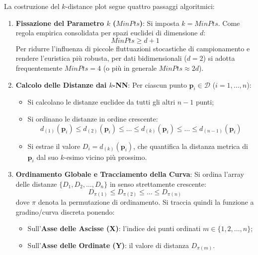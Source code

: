 La costruzione del $k$-distance plot segue quattro passaggi algoritmici:

\begin{enumerate}
    \item \textbf{Fissazione del Parametro $k$ ($MinPts$)}:
    Si imposta $k = MinPts$. Come regola empirica consolidata per spazi euclidei di dimensione $d$:
    \begin{equation}
        MinPts \ge d + 1
    \end{equation}
    Per ridurre l'influenza di piccole fluttuazioni stocastiche di campionamento e rendere l'euristica più robusta, per dati bidimensionali ($d = 2$) si adotta frequentemente $MinPts = 4$ (o più in generale $MinPts \approx 2d$).

    \item \textbf{Calcolo delle Distanze dai $k$-NN}:
    Per ciascun punto $\mathbf{p}_i \in \mathcal{D}$ ($i = 1, \dots, n$):
    \begin{itemize}[noitemsep]
        \item Si calcolano le distanze euclidee da tutti gli altri $n-1$ punti;
        \item Si ordinano le distanze in ordine crescente:
        \begin{equation}
            d_{(1)}(\mathbf{p}_i) \le d_{(2)}(\mathbf{p}_i) \le \dots \le d_{(k)}(\mathbf{p}_i) \le \dots \le d_{(n-1)}(\mathbf{p}_i)
        \end{equation}
        \item Si estrae il valore $D_i = d_{(k)}(\mathbf{p}_i)$, che quantifica la distanza metrica di $\mathbf{p}_i$ dal suo $k$-esimo vicino più prossimo.
    \end{itemize}

    \item \textbf{Ordinamento Globale e Tracciamento della Curva}:
    Si ordina l'array delle distanze $\{D_1, D_2, \dots, D_n\}$ in senso strettamente crescente:
    \begin{equation}
        D_{\pi(1)} \le D_{\pi(2)} \le \dots \le D_{\pi(n)}
    \end{equation}
    dove $\pi$ denota la permutazione di ordinamento.
    Si traccia quindi la funzione a gradino/curva discreta ponendo:
    \begin{itemize}[noitemsep]
        \item Sull'\textbf{Asse delle Ascisse (X)}: l'indice dei punti ordinati $m \in \{1, 2, \dots, n\}$;
        \item Sull'\textbf{Asse delle Ordinate (Y)}: il valore di distanza $D_{\pi(m)}$.
    \end{itemize}


\end{enumerate}

